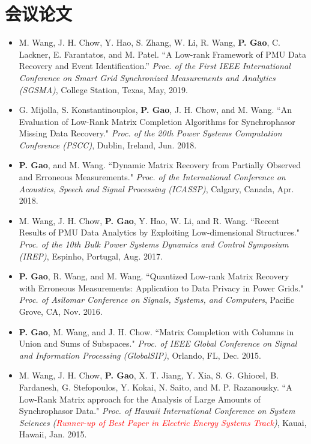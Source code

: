 \documentclass{resume}
\begin{document}
\section{会议论文}
\begin{itemize}[parsep=0.2ex]
\item {M. Wang, J. H. Chow, Y. Hao, S. Zhang, W. Li, R. Wang, {\bf P. Gao}, C. Lackner, E. Farantatos, and M. Patel. ``A Low-rank Framework of PMU Data Recovery and Event Identification.'' \emph{Proc. of the First IEEE International Conference on Smart Grid Synchronized Measurements and Analytics (SGSMA)}, College Station, Texas, May, 2019.}

\item {G. Mijolla, S. Konstantinouplos, {\bf P. Gao}, J. H. Chow, and M. Wang. ``An Evaluation of Low-Rank Matrix Completion Algorithms for Synchrophasor Missing Data Recovery." \emph{Proc. of the 20th Power Systems Computation Conference (PSCC)}, Dublin, Ireland, Jun. 2018.}

\item {{\bf P. Gao}, and M. Wang. ``Dynamic Matrix Recovery from Partially Observed and Erroneous Measurements." \emph{Proc. of the International Conference on Acoustics, Speech and Signal Processing (ICASSP)}, Calgary, Canada, Apr. 2018.}

\item {M. Wang, J. H. Chow, {\bf P. Gao}, Y. Hao, W. Li, and R. Wang. ``Recent Results of PMU Data Analytics by Exploiting Low-dimensional Structures." \emph{Proc. of the 10th Bulk Power Systems Dynamics and Control Symposium (IREP)}, Espinho, Portugal, Aug. 2017.}

\item {{\bf P. Gao}, R. Wang, and M. Wang. ``Quantized Low-rank Matrix Recovery with Erroneous Measurements: Application to Data Privacy in Power Grids." \emph{Proc. of Asilomar Conference on Signals, Systems, and Computers}, Pacific Grove, CA, Nov. 2016.}

\item {{\bf P. Gao}, M. Wang, and J. H. Chow. ``Matrix Completion with Columns in Union and Sums of Subspaces." \emph{Proc. of IEEE Global Conference on Signal and Information Processing (GlobalSIP)}, Orlando, FL, Dec. 2015.}

\item {M. Wang, J. H. Chow, {\bf P. Gao}, X. T. Jiang, Y. Xia, S. G. Ghiocel, B. Fardanesh, G. Stefopoulos, Y. Kokai, N. Saito, and M. P. Razanousky. ``A Low-Rank Matrix approach for the Analysis of Large Amounts of Synchrophasor Data." \emph{Proc. of Hawaii International Conference on System Sciences (\textcolor{red}{Runner-up of Best Paper in Electric Energy Systems Track})}, Kauai, Hawaii, Jan. 2015.}


\end{itemize}
\end{document}
